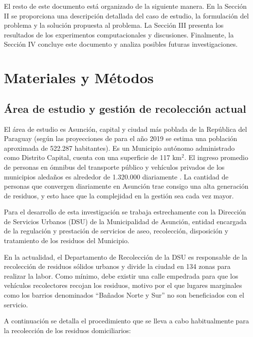 \documentclass[spanish, conference]{IEEEtran}
\begin{document}
El resto de este documento está organizado de la siguiente manera. En la Sección II se proporciona una descripción detallada del caso de estudio, la formulación del problema y la solución propuesta al problema. La Sección III presenta los resultados de los experimentos computacionales y discusiones. Finalmente, la Sección IV concluye este documento y analiza posibles futuras investigaciones.

\section{Materiales y Métodos}

\subsection{Área de estudio y gestión de recolección actual}

El área de estudio es Asunción, capital y ciudad más poblada de la República del Paraguay (según las proyecciones de \cite{2015Proyeccion2000-2025} para el año 2019 se estima una población aproximada de 522.287 habitantes). Es un Municipio autónomo administrado como Distrito Capital, cuenta con una superficie de 117 km$^{2}$. El ingreso promedio de personas en ómnibus del transporte público y vehículos privados de los municipios aledaños es alrededor de 1.320.000 diariamente \cite{DiarioABCColor2016PorColor}. La cantidad de personas que convergen diariamente en Asunción trae consigo una alta generación de residuos, y esto hace que la complejidad en la gestión sea cada vez mayor.

Para el desarrollo de esta investigación se trabaja estrechamente con la Dirección de Servicios Urbanos (DSU) de la Municipalidad de Asunción, entidad encargada de la regulación y prestación de servicios de aseo, recolección, disposición y tratamiento de los residuos del Municipio.

En la actualidad, el Departamento de Recolección de la DSU es responsable de la recolección de residuos sólidos urbanos y divide la ciudad en 134 zonas para realizar la labor. Como mínimo, debe existir una calle empedrada para que los vehículos recolectores recojan los residuos, motivo por el que lugares marginales como los barrios denominados ``Bañados Norte y Sur'' no son beneficiados con el servicio.

A continuación se detalla el procedimiento que se lleva a cabo habitualmente para la recolección de los residuos domiciliarios:
\end{document}
